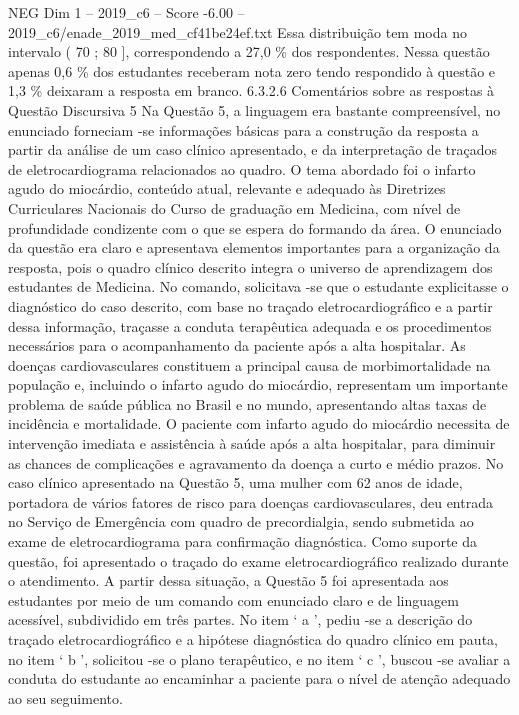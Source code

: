 \begin{textsample}{NEG Dim 1 – 2019\_c6 – Score -6.00 – 2019\_c6/enade\_2019\_med\_cf41be24ef.txt}
Essa distribuição tem moda no intervalo ( 70 ; 80 ], correspondendo a 27,0 \% dos respondentes.
Nessa questão apenas 0,6 \% dos estudantes receberam nota zero tendo respondido à questão e 1,3 \% deixaram a resposta em branco. 6.3.2.6 Comentários sobre as respostas à Questão Discursiva 5 Na Questão 5, a linguagem era bastante compreensível, no enunciado forneciam -se informações básicas para a construção da resposta a partir da análise de um caso clínico apresentado, e da interpretação de traçados de eletrocardiograma relacionados ao quadro.
O tema abordado foi o infarto agudo do miocárdio, conteúdo atual, relevante e adequado às Diretrizes Curriculares Nacionais do Curso de graduação em Medicina, com nível de profundidade condizente com o que se espera do formando da área.
O enunciado da questão era claro e apresentava elementos importantes para a organização da resposta, pois o quadro clínico descrito integra o universo de aprendizagem dos estudantes de Medicina.
No comando, solicitava -se que o estudante explicitasse o diagnóstico do caso descrito, com base no traçado eletrocardiográfico e a partir dessa informação, traçasse a conduta terapêutica adequada e os procedimentos necessários para o acompanhamento da paciente após a alta hospitalar.
As doenças cardiovasculares constituem a principal causa de morbimortalidade na população e, incluindo o infarto agudo do miocárdio, representam um importante problema de saúde pública no Brasil e no mundo, apresentando altas taxas de incidência e mortalidade.
O paciente com infarto agudo do miocárdio necessita de intervenção imediata e assistência à saúde após a alta hospitalar, para diminuir as chances de complicações e agravamento da doença a curto e médio prazos.
No caso clínico apresentado na Questão 5, uma mulher com 62 anos de idade, portadora de vários fatores de risco para doenças cardiovasculares, deu entrada no Serviço de Emergência com quadro de precordialgia, sendo submetida ao exame de eletrocardiograma para confirmação diagnóstica.
Como suporte da questão, foi apresentado o traçado do exame eletrocardiográfico realizado durante o atendimento.
A partir dessa situação, a Questão 5 foi apresentada aos estudantes por meio de um comando com enunciado claro e de linguagem acessível, subdividido em três partes.
No item ‘ a ’, pediu -se a descrição do traçado eletrocardiográfico e a hipótese diagnóstica do quadro clínico em pauta, no item ‘ b ’, solicitou -se o plano terapêutico, e no item ‘ c ’, buscou -se avaliar a conduta do estudante ao encaminhar a paciente para o nível de atenção adequado ao seu seguimento.

\end{textsample}
